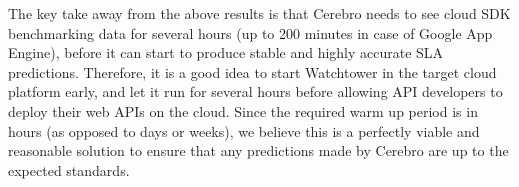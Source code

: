 The key take away from the above results is that Cerebro needs to see cloud SDK benchmarking data for several hours (up to 200 minutes in case of 
Google App Engine), before it can start to produce stable and highly accurate SLA predictions. Therefore, it is a good idea to start Watchtower in the
target cloud platform early, and let it run for several hours before allowing API developers to deploy their web APIs on the cloud. Since the
required warm up period is in hours (as opposed to days or weeks), we believe this is a perfectly viable and reasonable solution to
ensure that any predictions made by Cerebro are up to the expected standards.